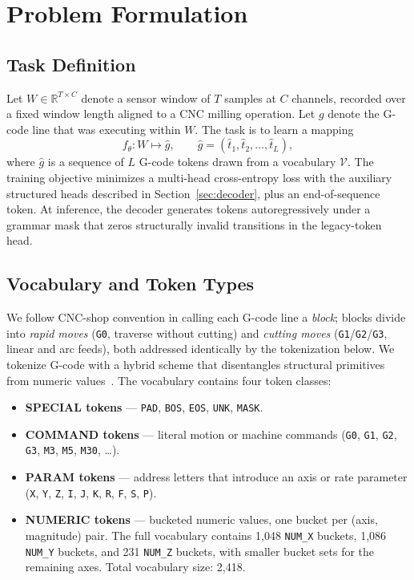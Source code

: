 \documentclass[sensors,article,submit,moreauthors,pdftex]{Definitions/mdpi}
\begin{document}
\section{Problem Formulation}
\label{sec:problem}

\subsection{Task Definition}
\label{sec:task}

Let $W \in \mathbb{R}^{T \times C}$ denote a sensor window of $T$ samples at $C$ channels, recorded over a fixed window length aligned to a CNC milling operation. Let $g$ denote the G-code line that was executing within $W$. The task is to learn a mapping
\begin{equation*}
  f_\theta: W \mapsto \hat{g}, \qquad \hat{g} = (\hat{t}_1, \hat{t}_2, \dots, \hat{t}_L),
\end{equation*}
where $\hat{g}$ is a sequence of $L$ G-code tokens drawn from a vocabulary $\mathcal{V}$. The training objective minimizes a multi-head cross-entropy loss with the auxiliary structured heads described in Section~\ref{sec:decoder}, plus an end-of-sequence token. At inference, the decoder generates tokens autoregressively under a grammar mask that zeros structurally invalid transitions in the legacy-token head.

\subsection{Vocabulary and Token Types}
\label{sec:problem-vocab}

We follow CNC-shop convention in calling each G-code line a \emph{block}; blocks divide into \emph{rapid moves} (\texttt{G0}, traverse without cutting) and \emph{cutting moves} (\texttt{G1}/\texttt{G2}/\texttt{G3}, linear and arc feeds), both addressed identically by the tokenization below. We tokenize G-code with a hybrid scheme that disentangles structural primitives from numeric values~\cite{grammar_paper,gcode_foundational}. The vocabulary contains four token classes:
\begin{itemize}
\item \textbf{SPECIAL tokens} --- \texttt{PAD}, \texttt{BOS}, \texttt{EOS}, \texttt{UNK}, \texttt{MASK}.
\item \textbf{COMMAND tokens} --- literal motion or machine commands (\texttt{G0}, \texttt{G1}, \texttt{G2}, \texttt{G3}, \texttt{M3}, \texttt{M5}, \texttt{M30}, \ldots).
\item \textbf{PARAM tokens} --- address letters that introduce an axis or rate parameter (\texttt{X}, \texttt{Y}, \texttt{Z}, \texttt{I}, \texttt{J}, \texttt{K}, \texttt{R}, \texttt{F}, \texttt{S}, \texttt{P}).
\item \textbf{NUMERIC tokens} --- bucketed numeric values, one bucket per (axis, magnitude) pair. The full vocabulary contains 1{,}048 \texttt{NUM\_X} buckets, 1{,}086 \texttt{NUM\_Y} buckets, and 231 \texttt{NUM\_Z} buckets, with smaller bucket sets for the remaining axes. Total vocabulary size: 2{,}418.
\end{itemize}
\end{document}
